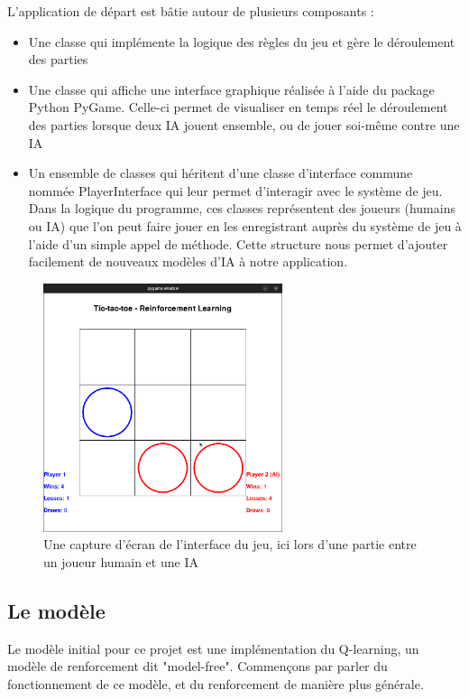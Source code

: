 \documentclass[french]{article}
\begin{document}
    L'application de départ est bâtie autour de plusieurs composants :
    \begin{itemize}
        \item Une classe qui implémente la logique des règles du jeu et gère le déroulement des parties
        \item Une classe qui affiche une interface graphique réalisée à l'aide du package Python PyGame. Celle-ci permet de visualiser en temps réel le déroulement des parties lorsque deux IA jouent ensemble, ou de jouer soi-même contre une IA
        \item Un ensemble de classes qui héritent d'une classe d'interface commune nommée PlayerInterface qui leur permet d'interagir avec le système de jeu. Dans la logique du programme, ces classes représentent des joueurs (humains ou IA) que l'on peut faire jouer en les enregistrant auprès du système de jeu à l'aide d'un simple appel de méthode. Cette structure nous permet d'ajouter facilement de nouveaux modèles d'IA à notre application.
    \end{itemize}

    \begin{figure}[h]
        \includegraphics[width=7cm]{game_screenshot}
        \centering
        \caption{Une capture d'écran de l'interface du jeu, ici lors d'une partie entre un joueur humain et une IA}
        \centering
    \end{figure}

    \subsection{Le modèle}
    Le modèle initial pour ce projet est une implémentation du Q-learning, un modèle de renforcement dit "model-free". Commençons par parler du fonctionnement de ce modèle, et du renforcement de manière plus générale.
\end{document}
